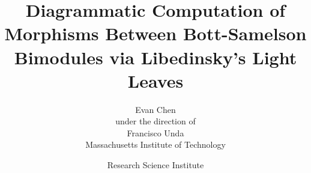 

\title{
Diagrammatic Computation of Morphisms Between Bott-Samelson Bimodules via Libedinsky's Light Leaves
}

\author{
Evan Chen
\vspace{0.5in} \\
under the direction of \\
Francisco Unda \\
Massachusetts Institute of Technology \\
\vspace{1in}
}


\date{
Research Science Institute\\
\rsifinalpaperdate
}
